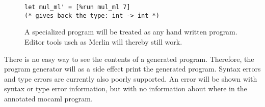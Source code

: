 \begin{figure}[H]
  \centering
\begin{verbatim}
let mul_ml' = [%run mul_ml 7]
(* gives back the type: int -> int *)
\end{verbatim}  
  \caption{A specialized program will be treated as any hand written program. Editor tools usch as Merlin will thereby still work.}
\end{figure}

There is no easy way to see the contents of a generated program. Therefore, the program generator will as a side effect print the generated program. Syntax errors and type errors are currently also poorly supported. An error will be shown with syntax or type error information, but with no information about where in the annotated mocaml program.


